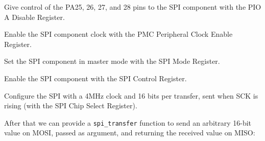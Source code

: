 \begin{Paragraph}
\begin{paracol}{2}

Give control of the PA25, 26, 27, and 28 pins to the SPI component with the PIO
A Disable Register.


Enable the SPI component clock with the PMC Peripheral Clock Enable Register.


Set the SPI component in master mode with the SPI Mode Register.


Enable the SPI component with the SPI Control Register.


Configure the SPI with a 4MHz clock and 16 bits per transfer, sent when SCK is
rising (with the SPI Chip Select Register).

\end{paracol}
\end{Paragraph}

After that we can provide a \verb!spi_transfer! function to send an arbitrary
16-bit value on MOSI, passed as argument, and returning the received value on
MISO:

